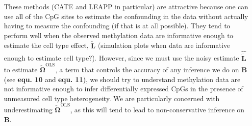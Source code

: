 \documentclass{article}
\begin{document}
\indent These methods (CATE and LEAPP in particular) are attractive because one can use all of the CpG sites to estimate the confounding in the data without actually having to measure the confounding (if that is at all possible). They tend to perform well when the observed methylation data are informative enough to estimate the cell type effect, $\bm{\tilde{L}}$ (simulation plots when data are informative enough to estimate cell type?). However, since we must use the noisy estimate $\hat{\tilde{\bm{L}}}$ to estimate $\tilde{\bm{\Omega}}^{\text{OLS}}$, a term that controls the accuracy of any inference we do on $\bm{B}$ (see \textbf{equ. 10} and \textbf{equ. 11}), we should try to understand methylation data are not informative enough to infer differentially expressed CpGs in the presence of unmeasured cell type heterogeneity. We are particularly concerned with underestimating $\tilde{\bm{\Omega}}^{\text{OLS}}$, as this will tend to lead to non-conservative inference on $\bm{B}$.
\end{document}
